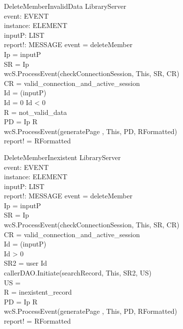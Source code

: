 \begin{schema}{DeleteMemberInvalidData}
\Delta LibraryServer \\
event: EVENT \\
instance: ELEMENT \\
inputP: LIST \\
report!: MESSAGE
\where event = deleteMember \\
Ip = \head inputP \\
SR = \lseq Ip \rseq \\ 
wcS.ProcessEvent(checkConnectionSession, This, SR, CR) \\
CR = valid\_connection\_and\_active\_session \\
Id = \head (\tail inputP) \\
Id = 0 \lor Id < 0 \\
R = not\_valid\_data \\
PD = \lseq Ip R \rseq \\
wcS.ProcessEvent(generatePage , This, PD, RFormatted) \\
report! = RFormatted 
\end{schema}

\begin{schema}{DeleteMemberInexistent}
\Delta LibraryServer \\
event: EVENT \\
instance: ELEMENT \\
inputP: LIST \\
report!: MESSAGE
\where event = deleteMember \\
Ip = \head inputP \\
SR = \lseq Ip \rseq \\ 
wcS.ProcessEvent(checkConnectionSession, This, SR, CR) \\
CR = valid\_connection\_and\_active\_session \\
Id = \head (\tail inputP) \\
Id > 0 \\
SR2 = \lseq user Id \rseq \\
callerDAO.Initiate(searchRecord, This, SR2, US) \\
US = \emptyset \\
R = inexistent\_record \\
PD = \lseq Ip R \rseq \\
wcS.ProcessEvent(generatePage , This, PD, RFormatted) \\
report! = RFormatted 
\end{schema}

